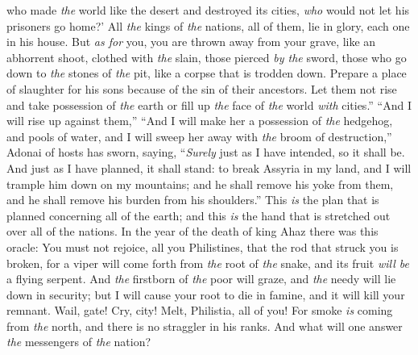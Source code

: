 \begin{biblechapter}
\verse who made \textit{the} world like the desert 
and destroyed its cities, 
\textit{who} would not let his prisoners go home?’
\verse All \textit{the} kings of \textit{the} nations, all of them, lie in glory, 
each one in his house.
\verse But \textit{as for} you, you are thrown away from your grave, 
like an abhorrent shoot, 
clothed with \textit{the} slain, 
those pierced \textit{by the} sword, 
those who go down to \textit{the} stones of \textit{the} pit, 
like a corpse that is trodden down.
\verse Prepare a place of slaughter for his sons 
because of the sin of their ancestors. 
Let them not rise and take possession of \textit{the} earth 
or fill up \textit{the} face of \textit{the} world \textit{with} cities.”
\verse “And I will rise up against them,”
\verse “And I will make her a possession of \textit{the} hedgehog, 
and pools of water, 
and I will sweep her away with \textit{the} broom of destruction,”
 Adonai of hosts has sworn, saying,
\verse “\textit{Surely} just as I have intended, so it shall be. 
And just as I have planned, it shall stand:
\verse to break Assyria in my land, 
and I will trample him down on my mountains; 
and he shall remove his yoke from them, 
and he shall remove his burden from his shoulders.”
\verse This \textit{is} the plan that is planned concerning all of the earth; 
and this \textit{is} the hand that is stretched out over all of the nations.
 In the year of the death of king Ahaz there was this oracle:
\verse You must not rejoice, all you Philistines, 
that the rod that struck you is broken, 
for a viper will come forth from \textit{the} root of \textit{the} snake, 
and its fruit \textit{will be} a flying serpent.
\verse And \textit{the} firstborn of \textit{the} poor will graze, 
and \textit{the} needy will lie down in security; 
but I will cause your root to die in famine, 
and it will kill your remnant.
\verse Wail, gate! Cry, city! 
Melt, Philistia, all of you! 
For smoke \textit{is} coming from \textit{the} north, 
and there is no straggler in his ranks.
\verse And what will one answer \textit{the} messengers of \textit{the} nation?
\end{biblechapter}

